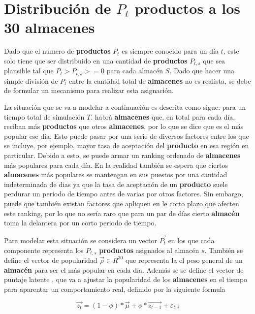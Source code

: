 \section{Distribución de $P_t$ productos a los 30 almacenes}

Dado que el número de \textbf{productos} $P_t$ es siempre conocido para un día $t$, este solo tiene que ser distribuido en una cantidad de \textbf{productos} $P_{t,s}$ que sea plausible tal que $P_t > P_{t,s} >= 0$ para cada almacén $S$. Dado que hacer una simple división de $P_t$ entre la cantidad total de \textbf{almacenes} no es realista, se debe de formular un mecanismo para realizar esta asignación.

La situación que se va a modelar a continuación es descrita como sigue: para un tiempo total de simulación $T$. habrá \textbf{almacenes} que, en total para cada día, reciban más \textbf{productos} que otros \textbf{almacenes}, por lo que se dice que es el más popular ese día. Esto puede pasar por una serie de diversos factores entre los que se incluye, por ejemplo, mayor tasa de aceptación del \textbf{producto} en esa región en particular. Debido a esto, se puede armar un ranking ordenado de \textbf{almacenes} más populares para cada día. En la realidad también se espera que ciertos \textbf{almacenes} más populares se mantengan en sus puestos por una cantidad indeterminada de dias ya que la tasa de aceptación de un \textbf{producto} suele perdurar un periodo de tiempo antes de varias por otros factores. Sin embargo, puede que también existan factores que apliquen en le corto plazo que afecten este ranking, por lo que no sería raro que para un par de días cierto \textbf{almacén} toma la delantera por un corto periodo de tiempo.

Para modelar esta situación se considera un vector $\overrightarrow{P_{t}}$ en los que cada componente representa los $P_{t,s}$ \textbf{productos} asignados al almacén $s$. También se define el vector de popularidad $\overrightarrow{\rho} \in R^{30}$ que representa la el peso general de un \textbf{almacén} para ser el más popular en cada día. Además se se define el vector de puntaje latente , que va a ajustar la popularidad de los \textbf{almacenes} en el tiempo para aparentar un comportamiento real, definido por la siguiente formula

\begin{equation}
    \label{eq:products_by_storage}
    \overrightarrow{z_{t}} = (1 - \phi) * \overrightarrow{\mu} + \phi * \overrightarrow{z_{t - 1}} + \varepsilon_{t,i}
\end{equation}

